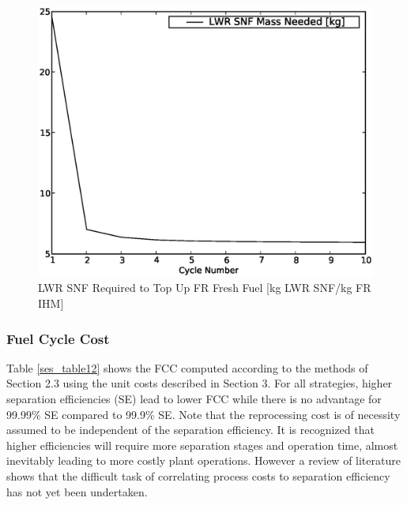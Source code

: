 \begin{figure}[htbp]
\caption{LWR SNF Required to Top Up FR Fresh Fuel [kg LWR SNF/kg FR IHM]}
\label{ses_fig10}
\begin{center}
\includegraphics[scale=0.5]{se_sensitivity/figs/LWRsnfNeeded.eps}
\end{center}
\end{figure}


\subsubsection{Fuel Cycle Cost}
\label{ses_sec:fcc}
Table \ref{ses_table12} shows the FCC computed according to the methods of Section 2.3
using the unit costs described in Section 3. For all strategies, higher
separation efficiencies (SE) lead to lower FCC while there is no
advantage for 99.99\% SE compared to 99.9\% SE.  Note that the
reprocessing cost is of necessity assumed to be independent of the
separation efficiency.  It is recognized that higher efficiencies will
require more separation stages and operation time, almost inevitably
leading to more costly plant operations.  However a review of literature
shows that the difficult task of correlating process costs to separation
efficiency has not yet been undertaken.

